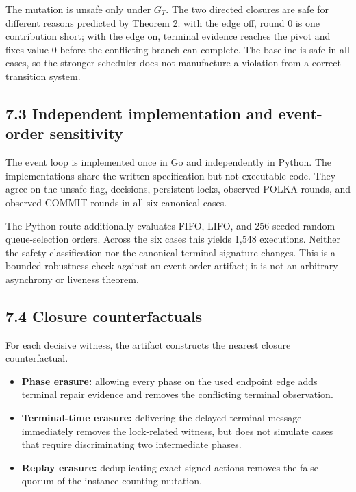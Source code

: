 \documentclass[10pt,a4paper]{article}
\newcommand{\tightlist}{\setlength{\itemsep}{0pt}\setlength{\parskip}{0pt}}
\begin{document}
The mutation is unsafe only under \(G_T\). The two directed closures are
safe for different reasons predicted by Theorem 2: with the edge off,
round 0 is one contribution short; with the edge on, terminal evidence
reaches the pivot and fixes value \(0\) before the conflicting branch
can complete. The baseline is safe in all cases, so the stronger
scheduler does not manufacture a violation from a correct transition
system.

\subsection{7.3 Independent implementation and event-order
sensitivity}\label{independent-implementation-and-event-order-sensitivity}

The event loop is implemented once in Go and independently in Python.
The implementations share the written specification but not executable
code. They agree on the unsafe flag, decisions, persistent locks,
observed POLKA rounds, and observed COMMIT rounds in all six canonical
cases.

The Python route additionally evaluates FIFO, LIFO, and 256 seeded
random queue-selection orders. Across the six cases this yields 1,548
executions. Neither the safety classification nor the canonical terminal
signature changes. This is a bounded robustness check against an
event-order artifact; it is not an arbitrary-asynchrony or liveness
theorem.

\subsection{7.4 Closure counterfactuals}\label{closure-counterfactuals}

For each decisive witness, the artifact constructs the nearest closure
counterfactual.

\begin{itemize}
\tightlist
\item
  \textbf{Phase erasure:} allowing every phase on the used endpoint edge
  adds terminal repair evidence and removes the conflicting terminal
  observation.
\item
  \textbf{Terminal-time erasure:} delivering the delayed terminal
  message immediately removes the lock-related witness, but does not
  simulate cases that require discriminating two intermediate phases.
\item
  \textbf{Replay erasure:} deduplicating exact signed actions removes
  the false quorum of the instance-counting mutation.
\end{itemize}
\end{document}
